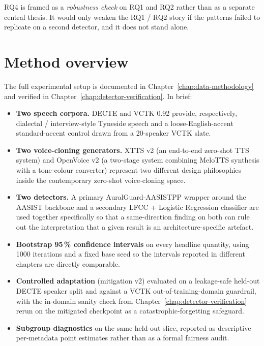 RQ4 is framed as a \emph{robustness check} on RQ1 and RQ2 rather
than as a separate central thesis. It would only weaken the RQ1 /
RQ2 story if the patterns failed to replicate on a second detector,
and it does not stand alone.


\section{Method overview}
\label{sec:introduction-method}

The full experimental setup is documented in Chapter~\ref{chap:data-methodology}
and verified in Chapter~\ref{chap:detector-verification}. In brief:

\begin{itemize}
    \item \textbf{Two speech corpora.} DECTE and VCTK 0.92 provide,
        respectively, dialectal / interview-style Tyneside speech and
        a loose-English-accent standard-accent control drawn from a
        20-speaker VCTK slate.
    \item \textbf{Two voice-cloning generators.} XTTS v2 (an end-to-end
        zero-shot TTS system) and OpenVoice v2 (a two-stage system
        combining MeloTTS synthesis with a tone-colour converter)
        represent two different design philosophies inside the
        contemporary zero-shot voice-cloning space.
    \item \textbf{Two detectors.} A primary AuralGuard-AASISTPP wrapper
        around the AASIST backbone \cite{Jung2022_AASIST} and a
        secondary LFCC + Logistic Regression classifier are used
        together specifically so that a same-direction finding on both
        can rule out the interpretation that a given result is an
        architecture-specific artefact.
    \item \textbf{Bootstrap 95\,\% confidence intervals} on every headline
        quantity, using 1000 iterations and a fixed base seed so the
        intervals reported in different chapters are directly
        comparable.
    \item \textbf{Controlled adaptation} (mitigation v2) evaluated on a
        leakage-safe held-out DECTE speaker split and against a VCTK
        out-of-training-domain guardrail, with the in-domain sanity
        check from Chapter~\ref{chap:detector-verification} rerun on the mitigated
        checkpoint as a catastrophic-forgetting safeguard.
    \item \textbf{Subgroup diagnostics} on the same held-out slice, reported
        as descriptive per-metadata point estimates rather than as a
        formal fairness audit.
\end{itemize}


